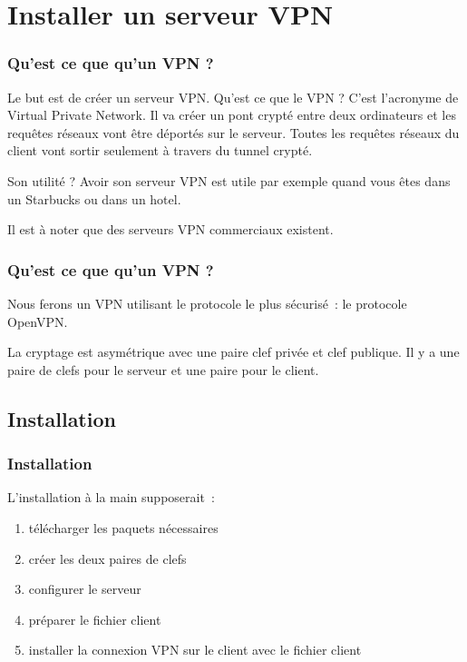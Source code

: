 \section{Installer un serveur VPN}

\begin{frame}[containsverbatim]
\frametitle{Qu'est ce que qu'un VPN ?}

Le but est de créer un serveur VPN. Qu'est ce que le VPN ? C'est l'acronyme de Virtual Private Network. Il va créer un pont crypté entre deux ordinateurs et les requêtes réseaux vont être déportés sur le serveur. Toutes les requêtes réseaux du client vont sortir seulement à travers du tunnel crypté.

Son utilité ? Avoir son serveur VPN est utile par exemple quand vous êtes dans un Starbucks ou dans un hotel. 

Il est à noter que des serveurs VPN commerciaux existent. 

\end{frame}

\begin{frame}[containsverbatim]
\frametitle{Qu'est ce que qu'un VPN ?}

Nous ferons un VPN utilisant le protocole le plus sécurisé~: le protocole OpenVPN.

La cryptage est asymétrique avec une paire clef privée et clef publique. Il y a une paire de clefs pour le serveur et une paire pour le client.

\end{frame}


\subsection{Installation}

\begin{frame}[containsverbatim]
\frametitle{Installation}

L'installation à la main supposerait~:
\begin{enumerate}
	\item télécharger les paquets nécessaires
	\item créer les deux paires de clefs
	\item configurer le serveur
	\item préparer le fichier client
	\item installer la connexion VPN sur le client avec le fichier client
\end{enumerate}

\end{frame}


